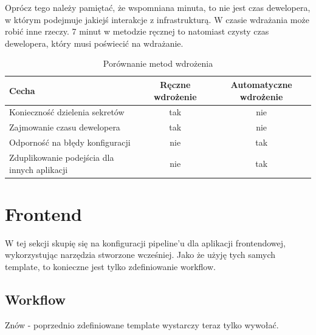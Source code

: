 \documentclass{article}
\begin{document}
Oprócz tego należy pamiętać, że wspomniana minuta, to nie jest czas dewelopera, w którym podejmuje jakiejś interakcje z infrastrukturą. W czasie wdrażania może robić inne rzeczy. 7 minut w metodzie ręcznej to natomiast czysty czas dewelopera, który musi poświecić na wdrażanie.

\begin{table}[H]
\centering
\begin{tabular}{|l|c|c|}
\hline
\textbf{Cecha} & \textbf{Ręczne wdrożenie} & \textbf{Automatyczne wdrożenie} \\ \hline
Konieczność dzielenia sekretów & \cellcolor{red!50}tak & \cellcolor{green!50}nie \\ \hline
Zajmowanie czasu dewelopera & \cellcolor{red!50}tak & \cellcolor{green!50}nie \\ \hline
Odporność na błędy konfiguracji & \cellcolor{red!50}nie & \cellcolor{green!50}tak \\ \hline
Zduplikowanie podejścia dla innych aplikacji & \cellcolor{red!50}nie & \cellcolor{green!50}tak \\ \hline
\end{tabular}
\caption{Porównanie metod wdrożenia}
\label{tab:porownanie-metod-wdrazania}
\end{table}



\section{Frontend}

W tej sekcji skupię się na konfiguracji pipeline’u dla aplikacji frontendowej, wykorzystując narzędzia
stworzone wcześniej. Jako że użyję tych samych template, to konieczne jest tylko zdefiniowanie
workflow.

\subsection{Workflow}

Znów - poprzednio zdefiniowane template wystarczy teraz tylko wywołać. 
\end{document}
